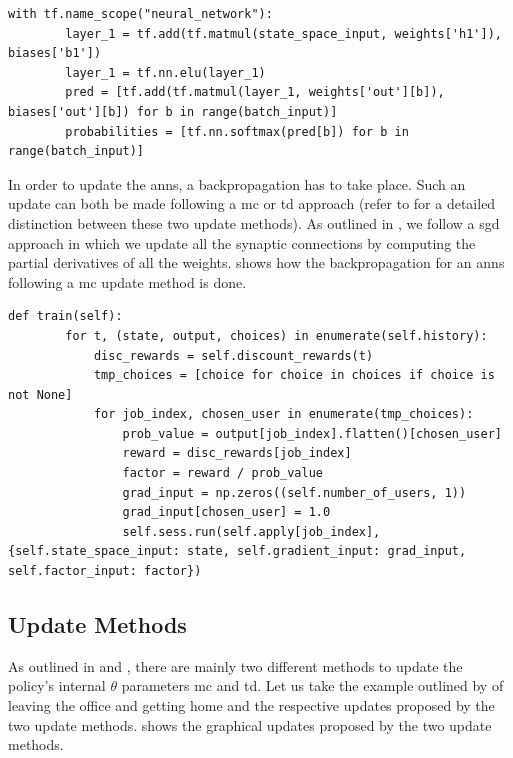 \begin{lstlisting}[caption=Modeling of a single perceptron in \gls{tf},label=lst:ann_1h,style=CustomPython]
	with tf.name_scope("neural_network"):
    	layer_1 = tf.add(tf.matmul(state_space_input, weights['h1']), biases['b1'])
    	layer_1 = tf.nn.elu(layer_1)
    	pred = [tf.add(tf.matmul(layer_1, weights['out'][b]), biases['out'][b]) for b in range(batch_input)]
    	probabilities = [tf.nn.softmax(pred[b]) for b in range(batch_input)]
\end{lstlisting}

In order to update the \glspl{ann}, a backpropagation has to take place. Such an update can both be made following a \gls{mc} or \gls{td} approach (refer to  for a detailed distinction between these two update methods). As outlined in , we follow a \gls{sgd} approach in which we update all the synaptic connections by computing the partial derivatives of all the weights.  shows how the backpropagation for an \glspl{ann} following a \gls{mc} update method is done.

\begin{lstlisting}[caption=Backpropagation algorithm following a \gls{mc} update approach,label=lst:mc_backpropagation,style=CustomPython]
    def train(self):
        for t, (state, output, choices) in enumerate(self.history):
            disc_rewards = self.discount_rewards(t)
            tmp_choices = [choice for choice in choices if choice is not None]
            for job_index, chosen_user in enumerate(tmp_choices):
                prob_value = output[job_index].flatten()[chosen_user]
                reward = disc_rewards[job_index]
                factor = reward / prob_value
                grad_input = np.zeros((self.number_of_users, 1))
                grad_input[chosen_user] = 1.0
                self.sess.run(self.apply[job_index], {self.state_space_input: state, self.gradient_input: grad_input, self.factor_input: factor})
\end{lstlisting}

\subsection{Update Methods}
\label{subsec:update_methods}

As outlined in  and , there are mainly two different methods to update the policy's internal $\theta$ parameters \ie \gls{mc} and \gls{td}. Let us take the example outlined by \citet[p. 130]{Sutton2017} of leaving the office and getting home and the respective updates proposed by the two update methods.  shows the graphical updates proposed by the two update methods.

